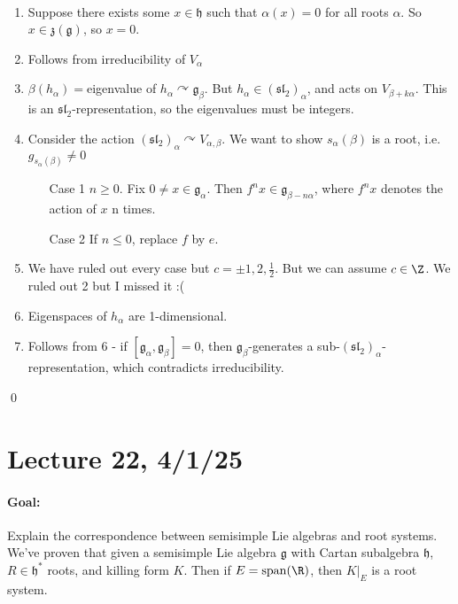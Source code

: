 \documentclass[x11names,reqno,14pt]{extarticle}
\newcommand{\mk}[1]{\mathfrak{#1}}
\newcommand{\g}{\mk{g}}
\newcommand{\h}{\mk{h}}
\renewcommand{\sl}{\mk{s}\mk{l}}
\DeclareMathOperator{\Span}{span}
\begin{document}
\proof
\,
\begin{enumerate}

\item Suppose there exists some $x \in \h$ such that $\alpha(x) = 0$ for all roots $\alpha$. So $x \in \mk{z}(\g)$, so $x = 0$. 

\item Follows from irreducibility of $V_\alpha$

\item $\beta(h_\alpha) = $eigenvalue of $h_\alpha\curvearrowright \g_\beta$. But $h_\alpha \in (\sl_2)_\alpha$, and acts on $V_{\beta+k\alpha}$. This is an $\sl_2$-representation, so the eigenvalues must be integers. 

\item Consider the action $(\sl_2)_\alpha\curvearrowright V_{\alpha,\beta}$. We want to show $s_\alpha(\beta)$ is a root, i.e. $g_{s_\alpha(\beta)} \neq 0$

\begin{enumerate}

\item[Case 1] $n\geq 0$. Fix $0\neq x\in\g_\alpha$. Then $f^nx \in \g_{\beta-n\alpha}$, where $f^nx$ denotes the action of $x$ n times. 

\item[Case 2] If $n \leq 0$, replace $f$ by $e$. 

\end{enumerate}

\item We have ruled out every case but $c = \pm 1, 2, \frac12$. But we can assume $c \in \Z$. We ruled out 2 but I missed it :(

\item Eigenspaces of $h_\alpha$ are 1-dimensional. 

\item Follows from 6 - if $[\g_\alpha,\g_\beta] = 0$, then $\g_\beta$-generates a sub-$(\sl_2)_\alpha$-representation, which contradicts irreducibility. 

\end{enumerate}

\qed

\section*{Lecture 22, 4/1/25}

\paragraph{Goal:} Explain the correspondence between semisimple Lie algebras and root systems. We've proven that given a semisimple Lie algebra $\g$ with Cartan subalgebra $\h$, $R \in \h^*$ roots, and killing form $K$. Then if $E = \Span(\R)$, then $K|_E$ is a root system. 
\end{document}
